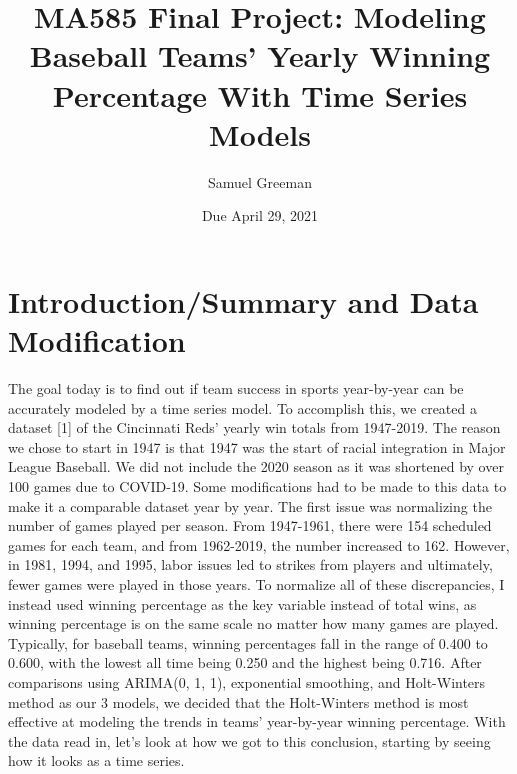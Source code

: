 \documentclass[12pt]{article}
\title{MA585 Final Project: Modeling Baseball Teams' Yearly Winning Percentage With Time Series Models}
\author{Samuel Greeman}
\date{Due April 29, 2021}
\begin{document}
\maketitle 



\setdefaultleftmargin{0pt}{}{}{}{}{}

\section{Introduction/Summary and Data Modification}\label{sec:intro}
The goal today is to find out if team success in sports year-by-year can be accurately modeled by a time series model. To accomplish this, we created a dataset [1] of the Cincinnati Reds' yearly win totals from 1947-2019. The reason we chose to start in 1947 is that 1947 was the start of racial integration in Major League Baseball. We did not include the 2020 season as it was shortened by over 100 games due to COVID-19. Some modifications had to be made to this data to make it a comparable dataset year by year. The first issue was normalizing the number of games played per season. From 1947-1961, there were 154 scheduled games for each team, and from 1962-2019, the number increased to 162. However, in 1981, 1994, and 1995, labor issues led to strikes from players and ultimately, fewer games were played in those years. To normalize all of these discrepancies, I instead used winning percentage as the key variable instead of total wins, as winning percentage is on the same scale no matter how many games are played. Typically, for baseball teams, winning percentages fall in the range of 0.400 to 0.600, with the lowest all time being 0.250 and the highest being 0.716. After comparisons using ARIMA(0, 1, 1), exponential smoothing, and Holt-Winters method as our 3 models, we decided that the Holt-Winters method is most effective at modeling the trends in teams' year-by-year winning percentage. With the data read in, let's look at how we got to this conclusion, starting by seeing how it looks as a time series.\\
\end{document}
